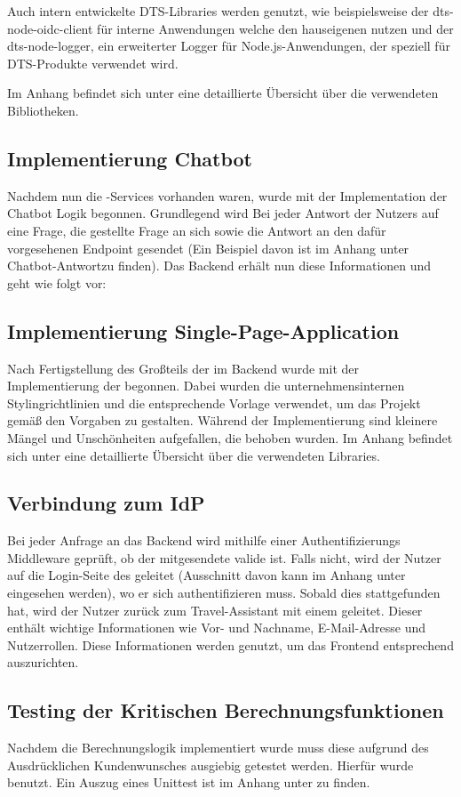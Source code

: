Auch intern entwickelte DTS-Libraries werden genutzt, wie beispielsweise der dts-node-oidc-client für interne Anwendungen welche den hauseigenen  nutzen und der dts-node-logger, ein erweiterter Logger für Node.js-Anwendungen, der speziell für DTS-Produkte verwendet wird.

Im Anhang befindet sich unter  eine detaillierte Übersicht über die verwendeten Bibliotheken.

\subsection{Implementierung Chatbot}
Nachdem nun die -Services vorhanden waren, wurde mit der Implementation der Chatbot Logik begonnen. Grundlegend wird Bei jeder Antwort der Nutzers auf eine Frage, die gestellte Frage an sich sowie die Antwort an den dafür vorgesehenen Endpoint gesendet (Ein Beispiel davon ist im Anhang unter Chatbot-Antwort\todo zu finden). Das Backend erhält nun diese Informationen und geht wie folgt vor:


\subsection{Implementierung Single-Page-Application}

Nach Fertigstellung des Großteils der  im Backend wurde mit der Implementierung der  begonnen. Dabei wurden die unternehmensinternen Stylingrichtlinien und die entsprechende Vorlage verwendet, um das Projekt gemäß den Vorgaben zu gestalten. Während der Implementierung sind kleinere Mängel und Unschönheiten aufgefallen, die behoben wurden. Im Anhang befindet sich unter  eine detaillierte Übersicht über die verwendeten Libraries.

\subsection{Verbindung zum IdP}

Bei jeder Anfrage an das Backend wird mithilfe einer Authentifizierungs Middleware geprüft, ob der mitgesendete  valide ist. Falls nicht, wird der Nutzer auf die Login-Seite des  geleitet (Ausschnitt davon kann im Anhang unter  eingesehen werden), wo er sich authentifizieren muss. Sobald dies stattgefunden hat, wird der Nutzer zurück zum Travel-Assistant mit einem  geleitet. Dieser  enthält wichtige Informationen wie Vor- und Nachname, E-Mail-Adresse und Nutzerrollen. Diese Informationen werden genutzt, um das Frontend entsprechend auszurichten.

\subsection{Testing der Kritischen Berechnungsfunktionen}

Nachdem die Berechnungslogik implementiert wurde muss diese aufgrund des Ausdrücklichen Kundenwunsches ausgiebig getestet werden. Hierfür wurde  benutzt. Ein Auszug eines Unittest ist im Anhang unter  zu finden.